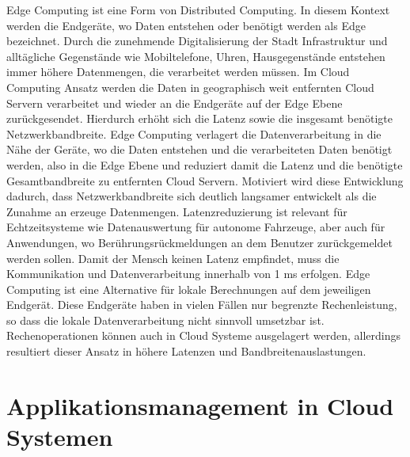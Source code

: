 Edge Computing ist eine Form von Distributed Computing. In diesem Kontext werden die Endgeräte, wo Daten entstehen oder benötigt werden als Edge bezeichnet. Durch die zunehmende Digitalisierung der Stadt Infrastruktur und alltägliche Gegenstände wie Mobiltelefone, Uhren, Hausgegenstände entstehen immer höhere Datenmengen, die verarbeitet werden müssen. Im Cloud Computing Ansatz werden die Daten in geographisch weit entfernten Cloud Servern verarbeitet und wieder an die Endgeräte auf der Edge Ebene zurückgesendet. Hierdurch erhöht sich die Latenz sowie die insgesamt benötigte Netzwerkbandbreite. Edge Computing verlagert die Datenverarbeitung in die Nähe der Geräte, wo die Daten entstehen und die verarbeiteten Daten benötigt werden, also in die Edge Ebene und reduziert damit die Latenz und die benötigte Gesamtbandbreite zu entfernten Cloud Servern. \cite{Wang2019} Motiviert wird diese Entwicklung dadurch, dass Netzwerkbandbreite sich deutlich langsamer entwickelt als die Zunahme an erzeuge Datenmengen.\cite{Shi2016} Latenzreduzierung ist relevant für Echtzeitsysteme wie Datenauswertung für autonome Fahrzeuge, aber auch für Anwendungen, wo Berührungsrückmeldungen an dem Benutzer zurückgemeldet werden sollen. Damit der Mensch keinen Latenz empfindet, muss die Kommunikation und Datenverarbeitung innerhalb von 1 ms erfolgen. \cite{Varsha2017} Edge Computing ist eine Alternative für lokale Berechnungen auf dem jeweiligen Endgerät. Diese Endgeräte haben in vielen Fällen nur begrenzte Rechenleistung, so dass die lokale Datenverarbeitung nicht sinnvoll umsetzbar ist. Rechenoperationen können auch in Cloud Systeme ausgelagert werden, allerdings resultiert dieser Ansatz in höhere Latenzen und Bandbreitenauslastungen. \cite{Lin2020} 

\section{Applikationsmanagement in Cloud Systemen}

